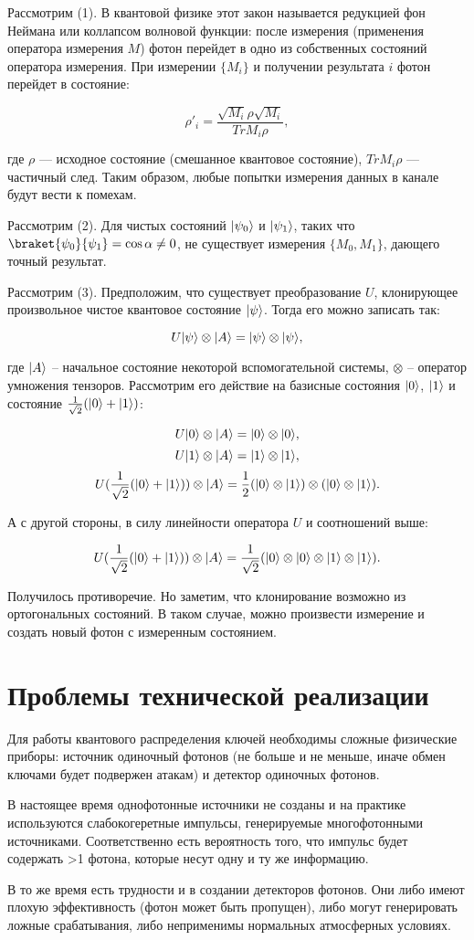 \documentclass[a4paper,14pt]{extarticle}
\DeclarePairedDelimiter\ket{\lvert}{\rangle}
\begin{document}
Рассмотрим (1). В квантовой физике этот закон называется редукцией фон Неймана
или коллапсом волновой функции: после измерения (применения оператора измерения
$M$) фотон перейдет в одно из собственных состояний оператора измерения. При
измерении $\{M_i\}$ и получении результата $i$ фотон перейдет в состояние:

$$ \rho'_i = \frac{\sqrt{M_i}\rho\sqrt{M_i}}{TrM_i\rho}, $$

где $\rho$ --- исходное состояние (смешанное квантовое состояние), $TrM_i\rho$
--- частичный след. Таким образом, любые попытки измерения данных в канале
будут вести к помехам.

Рассмотрим (2). Для чистых состояний $\ket{\psi_0}$ и $\ket{\psi_1}$, таких что
$\braket{\psi_0}{\psi_1} = \cos \alpha \neq 0$, не существует измерения $\{M_0,
M_1\}$, дающего точный результат.

Рассмотрим (3). Предположим, что существует преобразование $U$, клонирующее
произвольное чистое квантовое состояние $\ket{\psi}$. Тогда его можно записать
так:

$$ U\ket{\psi} \otimes \ket{A} = \ket{\psi} \otimes \ket{\psi}, $$

где $\ket{A}$ -- начальное состояние некоторой вспомогательной системы,
$\otimes$ -- оператор умножения тензоров. Рассмотрим его действие на базисные
состояния $\ket{0}$, $\ket{1}$ и состояние $\frac{1}{\sqrt{2}}(\ket{0} +
\ket{1})$:

$$ U\ket{0} \otimes \ket{A} = \ket{0} \otimes \ket{0}, $$
$$ U\ket{1} \otimes \ket{A} = \ket{1} \otimes \ket{1}, $$
$$ U(\frac{1}{\sqrt{2}}(\ket{0} + \ket{1})) \otimes \ket{A} =
\frac{1}{2}(\ket{0} \otimes \ket{1}) \otimes (\ket{0} \otimes \ket{1}). $$

А с другой стороны, в силу линейности оператора $U$ и соотношений выше:

$$ U(\frac{1}{\sqrt{2}}(\ket{0} + \ket{1})) \otimes \ket{A} =
\frac{1}{\sqrt{2}}(\ket{0} \otimes \ket{0} \otimes \ket{1} \otimes \ket{1}). $$

Получилось противоречие. Но заметим, что клонирование возможно из ортогональных
состояний. В таком случае, можно произвести измерение и создать новый фотон с
измеренным состоянием.

\section{Проблемы технической реализации}

Для работы квантового распределения ключей необходимы сложные физические
приборы: источник одиночный фотонов (не больше и не меньше, иначе обмен ключами
будет подвержен атакам) и детектор одиночных фотонов.

В настоящее время однофотонные источники не созданы и на практике используются
слабокогеретные импульсы, генерируемые многофотонными источниками.
Соответственно есть вероятность того, что импульс будет содержать >1 фотона,
которые несут одну и ту же информацию.

В то же время есть трудности и в создании детекторов фотонов. Они либо имеют
плохую эффективность (фотон может быть пропущен), либо могут генерировать
ложные срабатывания, либо неприменимы нормальных атмосферных условиях.
\end{document}
